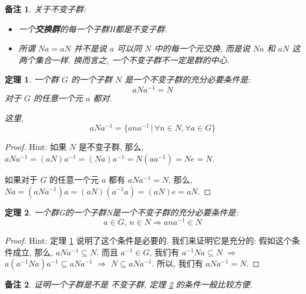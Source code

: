 \documentclass[utf8]{ctexbook}
\newtheorem{theorem}{定理}[section]
\newtheorem{memo}{备注}[section]
\begin{document}
\begin{memo}
关于不变子群:
\begin{itemize}
\item{一个\textbf{交换群}的每一个子群H都是不变子群.}
\item{所谓 $Na = aN$ 并不是说 $a$ 可以同 $N$ 中的每一个元交换, 而是说 $Na$ 和 $aN$ 这两个集合一样. 换而言之, 一个不变子群不一定是群的中心.}
\end{itemize}
\end{memo}

\begin{theorem}\label{thm_coset_iff_1}
一个群 $G$ 的一个子群 $N$ 是一个不变子群的充分必要条件是:
\begin{equation*}
aNa^{-1} = N
\end{equation*}
对于 $G$ 的任意一个元 $a$ 都对.


这里, $$ aNa^{-1} = \{ ana^{-1} \, | \, \forall n \in N, \forall a \in G \} $$
\end{theorem}

\begin{proof}
Hint: 如果 $N$ 是不变子群, 那么, $aNa^{-1} = (aN)a^{-1} =  (Na) a^{-1} = N(a a^{-1}) = Ne = N$.

如果对于 $G$ 的任意一个元 $a$ 都有 $aNa^{-1} = N$, 那么, $Na = (aNa^{-1})a = (aN) (a^{-1} a) = (a N) e = aN$.
\end{proof}

\begin{theorem}\label{thm_coset_iff_2}
一个群G的一个子群N是一个不变子群的充分必要条件是:
\begin{equation*}
a \in G, \, n \in N \Longrightarrow ana^{-1} \in N
\end{equation*}


\end{theorem}

\begin{proof}
Hint: 定理 \ref{thm_coset_iff_1} 说明了这个条件是必要的. 我们来证明它是充分的: 假如这个条件成立, 那么, $aNa^{-1} \subseteq N$. 而且 $a^{-1} \in G$, 我们有 $a^{-1}Na \subseteq N$ $\Longrightarrow$ $ a (a^{-1}Na ) a^{-1} \subseteq a N a^{-1} $ $\Longrightarrow$ $ N \subseteq a N a^{-1} $. 所以, 我们有 $aNa^{-1} = N$.
\end{proof}

\begin{memo}
证明一个子群是不是 不变子群, 定理 \ref{thm_coset_iff_2} 的条件一般比较方便.
\end{memo}
\end{document}

